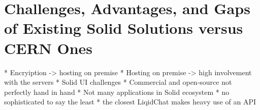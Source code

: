 \section{Challenges, Advantages, and Gaps of Existing Solid Solutions versus CERN Ones}

* Encryiption -> hosting on premise
* Hosting on premise -> high involvement with the servers
* Solid UI challenges
* Commercial and open-source not perfectly hand in hand
* Not many applications in Solid ecosystem
    * no sophisticated to say the least
    * the closest LiqidChat makes heavy use of an API